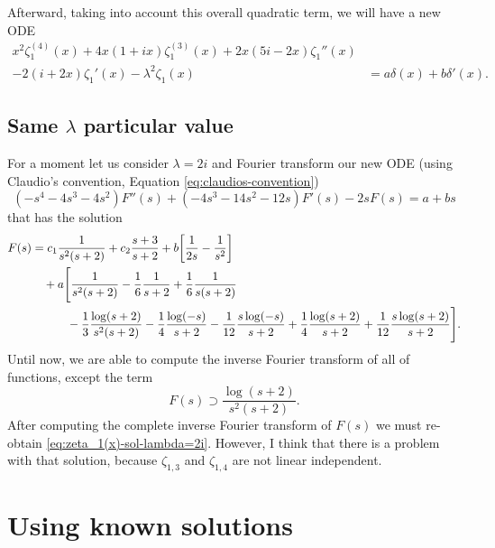 \documentclass[%
 aip,
 jmp,%
 amsmath,amssymb,
 reprint,%
]{revtex4-2}
\begin{document}
Afterward, taking into account this overall quadratic term, we will have a new ODE
\begin{equation}
\begin{aligned}
x^2\zeta_1^{(4)}(x) + 4x(1+ ix)\zeta_1^{(3)}(x) + 2x (5i-2x)\zeta_1''(x)&\\
- 2(i+2x)\zeta_1'(x) - \lambda^2\zeta_1(x) &= a\delta(x) + b\delta'(x).
\end{aligned}
\end{equation}
\subsection{Same $\lambda$ particular value}

For a moment let us consider $\lambda = 2i$ and Fourier transform our new ODE (using Claudio's convention, Equation \eqref{eq:claudios-convention})
\begin{equation}
\left(-s^4-4 s^3-4 s^2\right) F''(s)+\left(-4 s^3-14 s^2-12 s\right) F'(s)-2 s F(s)=a+b s
\end{equation}
that has the solution
\begin{equation}
\begin{aligned}
F(s) &= c_1\frac{1}{s^2 (s+2)} + c_2\frac{s+3}{ s+2} + b\qty[\frac{1}{2s} - \frac{1}{s^2}]\\
&\quad + a\Bigg[\frac{1}{s^2 (s+2)}-\frac{1}{6}\frac{1}{s+2} + \frac{1}{6}\frac{1}{ s (s+2)}\\
&\qquad\quad -\frac{1}{3}\frac{\log (s+2)}{s^2 (s+2)} -\frac{1}{4}\frac{\log (-s)}{ s+2} -\frac{1}{12}\frac{s \log (-s)}{s+2} + \frac{1}{4}\frac{\log (s+2)}{s+2}+\frac{1}{12}\frac{s \log (s+2)}{s+2}\Bigg].
\end{aligned}
\end{equation}
Until now, we are able to compute the inverse Fourier transform of all of functions, except the term
\begin{equation*}
F(s) \supset \frac{\log(s+2)}{s^2(s+2)}.
\end{equation*}
After computing the complete inverse Fourier transform of $F(s)$ we must re-obtain \eqref{eq:zeta_1(x)-sol-lambda=2i}. However, I think that there is a problem with that solution, because $\zeta_{1,3}$ and $\zeta_{1,4}$ are not linear independent.




\section{Using known solutions}
\end{document}
